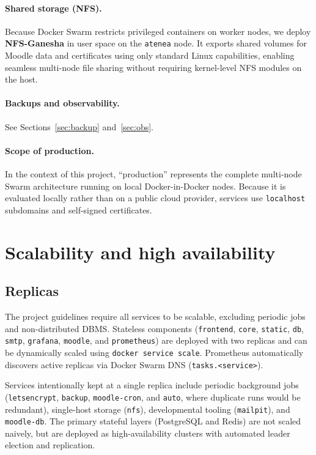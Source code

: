 \documentclass[11pt,a4paper]{article}
\newcommand{\svc}[1]{\texttt{#1}}
\begin{document}
\paragraph{Shared storage (NFS).} Because Docker Swarm restricts privileged containers on worker nodes, we deploy \textbf{NFS-Ganesha} in user space on the \texttt{atenea} node. It exports shared volumes for Moodle data and certificates using only standard Linux capabilities, enabling seamless multi-node file sharing without requiring kernel-level NFS modules on the host.

\paragraph{Backups and observability.} See Sections~\ref{sec:backup} and~\ref{sec:obs}.

\paragraph{Scope of production.} In the context of this project, ``production'' represents the complete multi-node Swarm architecture running on local Docker-in-Docker nodes. Because it is evaluated locally rather than on a public cloud provider, services use \texttt{localhost} subdomains and self-signed certificates.

\section{Scalability and high availability}

\subsection{Replicas}

The project guidelines require all services to be scalable, excluding periodic jobs and non-distributed DBMS. Stateless components (\svc{frontend}, \svc{core}, \svc{static}, \svc{db}, \svc{smtp}, \svc{grafana}, \svc{moodle}, and \svc{prometheus}) are deployed with two replicas and can be dynamically scaled using \texttt{docker service scale}. Prometheus automatically discovers active replicas via Docker Swarm DNS (\texttt{tasks.<service>}).

Services intentionally kept at a single replica include periodic background jobs (\svc{letsencrypt}, \svc{backup}, \svc{moodle-cron}, and \svc{auto}, where duplicate runs would be redundant), single-host storage (\svc{nfs}), developmental tooling (\svc{mailpit}), and \svc{moodle-db}. The primary stateful layers (PostgreSQL and Redis) are not scaled naively, but are deployed as high-availability clusters with automated leader election and replication.
\end{document}
